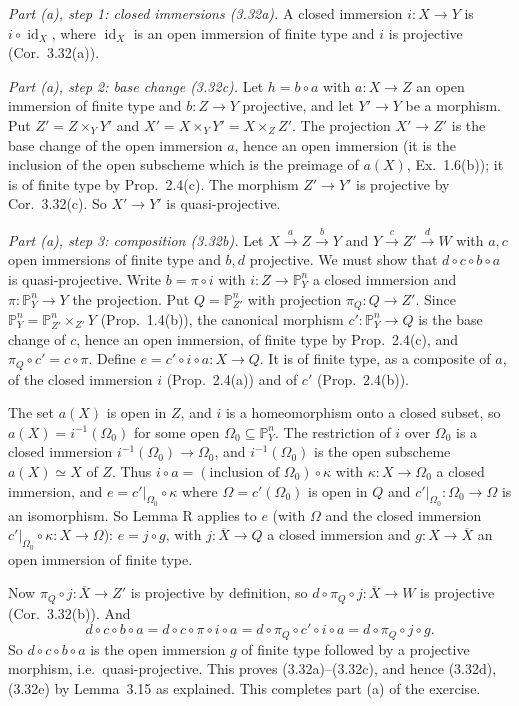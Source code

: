 \documentclass[11pt]{article}
\begin{document}
\emph{Part (a), step 1: closed immersions (3.32a).} A closed immersion $i:X\to Y$ is $i\circ\operatorname{id}_X$, where $\operatorname{id}_X$ is an open immersion of finite type and $i$ is projective (Cor.~3.32(a)).

\emph{Part (a), step 2: base change (3.32c).} Let $h=b\circ a$ with $a:X\to Z$ an open immersion of finite type and $b:Z\to Y$ projective, and let $Y'\to Y$ be a morphism. Put $Z'=Z\times_YY'$ and $X'=X\times_YY'=X\times_ZZ'$. The projection $X'\to Z'$ is the base change of the open immersion $a$, hence an open immersion (it is the inclusion of the open subscheme which is the preimage of $a(X)$, Ex.~1.6(b)); it is of finite type by Prop.~2.4(c). The morphism $Z'\to Y'$ is projective by Cor.~3.32(c). So $X'\to Y'$ is quasi-projective.

\emph{Part (a), step 3: composition (3.32b).} Let $X\xrightarrow{a}Z\xrightarrow{b}Y$ and $Y\xrightarrow{c}Z'\xrightarrow{d}W$ with $a,c$ open immersions of finite type and $b,d$ projective. We must show that $d\circ c\circ b\circ a$ is quasi-projective. Write $b=\pi\circ i$ with $i:Z\to\mathbb{P}^n_Y$ a closed immersion and $\pi:\mathbb{P}^n_Y\to Y$ the projection. Put $Q=\mathbb{P}^n_{Z'}$ with projection $\pi_Q:Q\to Z'$. Since $\mathbb{P}^n_Y=\mathbb{P}^n_{Z'}\times_{Z'}Y$ (Prop.~1.4(b)), the canonical morphism $c':\mathbb{P}^n_Y\to Q$ is the base change of $c$, hence an open immersion, of finite type by Prop.~2.4(c), and $\pi_Q\circ c'=c\circ\pi$. Define $e=c'\circ i\circ a:X\to Q$. It is of finite type, as a composite of $a$, of the closed immersion $i$ (Prop.~2.4(a)) and of $c'$ (Prop.~2.4(b)).

The set $a(X)$ is open in $Z$, and $i$ is a homeomorphism onto a closed subset, so $a(X)=i^{-1}(\Omega_0)$ for some open $\Omega_0\subseteq\mathbb{P}^n_Y$. The restriction of $i$ over $\Omega_0$ is a closed immersion $i^{-1}(\Omega_0)\to\Omega_0$, and $i^{-1}(\Omega_0)$ is the open subscheme $a(X)\simeq X$ of $Z$. Thus $i\circ a=(\text{inclusion of }\Omega_0)\circ\kappa$ with $\kappa:X\to\Omega_0$ a closed immersion, and $e=c'|_{\Omega_0}\circ\kappa$ where $\Omega=c'(\Omega_0)$ is open in $Q$ and $c'|_{\Omega_0}:\Omega_0\to\Omega$ is an isomorphism. So Lemma R applies to $e$ (with $\Omega$ and the closed immersion $c'|_{\Omega_0}\circ\kappa:X\to\Omega$): $e=j\circ g$, with $j:\overline X\to Q$ a closed immersion and $g:X\to\overline X$ an open immersion of finite type.

Now $\pi_Q\circ j:\overline X\to Z'$ is projective by definition, so $d\circ\pi_Q\circ j:\overline X\to W$ is projective (Cor.~3.32(b)). And
\[ d\circ c\circ b\circ a=d\circ c\circ\pi\circ i\circ a=d\circ\pi_Q\circ c'\circ i\circ a=d\circ\pi_Q\circ j\circ g. \]
So $d\circ c\circ b\circ a$ is the open immersion $g$ of finite type followed by a projective morphism, i.e.\ quasi-projective. This proves (3.32a)--(3.32c), and hence (3.32d), (3.32e) by Lemma~3.15 as explained. This completes part (a) of the exercise.
\end{document}
